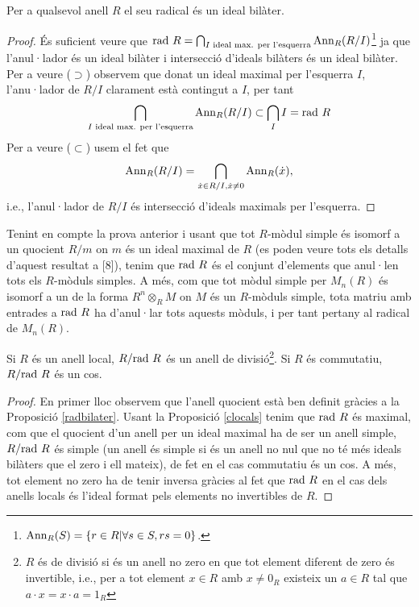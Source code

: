\begin{prop}\label{radbilater}
Per a qualsevol anell $R$ el seu radical és un ideal bilàter. 
\end{prop}
\begin{proof}
És suficient veure que $\mathrm{rad} \  R = \bigcap_{I \text{ ideal max. per l'esquerra}} \mathrm{Ann}_R(R/I)$\footnote{$\mathrm{Ann}_R(S)=\{r\in R | \forall s\in S, rs=0 \}$.} ja que l'anul·lador és un ideal bilàter i intersecció d'ideals bilàters és un ideal bilàter.
Per a veure ($\supset$) observem que donat un ideal maximal per l'esquerra $I$, l'anu·lador de $R/I$ clarament està contingut a $I$, per tant 
$$
\bigcap_{I \text{ ideal max. per l'esquerra}} \mathrm{Ann}_R (R/I) \subset \bigcap_I I = \mathrm{rad} \  R
$$
Per a veure ($\subset$) usem el fet que
$$
\mathrm{Ann}_R (R/I) = \bigcap_{\dot{x} \in R/I, \dot{x} \neq 0} \mathrm{Ann}_R (\dot{x}),
$$
i.e., l'anul·lador de $R/I$ és intersecció d'ideals maximals per l'esquerra.
\end{proof}

\begin{obs}
Tenint en compte la prova anterior i usant que tot $R$-mòdul simple és isomorf a un quocient $R/m$ on $m$ és un ideal maximal de $R$ (es poden veure tots els detalls d'aquest resultat a [8]), tenim que $\mathrm{rad} \  R$ és el conjunt d'elements que anul·len tots els $R$-mòduls simples. A més, com que tot mòdul simple per $M_n(R)$ és isomorf a un de la forma $R^n \otimes_R M$ on $M$ és un $R$-mòduls simple, tota matriu amb entrades a $\mathrm{rad} \  R$ ha d'anul·lar tots aquests mòduls, i per tant pertany al radical de $M_n(R)$.

\end{obs}

\begin{corollary}\label{rradRdivring}
 Si $R$ és un anell local, $R/\mathrm{rad} \  R$ és un anell de divisió\footnote{$R$ és de divisió si és un anell no zero en que tot element diferent de zero és invertible, i.e., per a tot element $x\in R$ amb $x\neq 0_R$ existeix un $a\in R$ tal que $a\cdot x = x\cdot a = 1_R$}. Si $R$ és commutatiu, $R/\mathrm{rad} \  R$ és un cos.
\end{corollary}
\begin{proof}En primer lloc observem que l'anell quocient està ben definit gràcies a la Proposició \ref{radbilater}.
Usant la Proposició \ref{clocals} tenim que $\mathrm{rad} \  R$ és maximal, com que el quocient d'un anell per un ideal maximal ha de ser un anell simple, $R/\mathrm{rad} \  R$ és simple (un anell és simple si és un anell no nul que no té més ideals bilàters que el zero i ell mateix), de fet en el cas commutatiu és un cos. A més, tot element no zero ha de tenir inversa gràcies al fet que $\mathrm{rad} \  R$ en el cas dels anells locals és l'ideal format pels elements no invertibles de $R$.
\end{proof}



